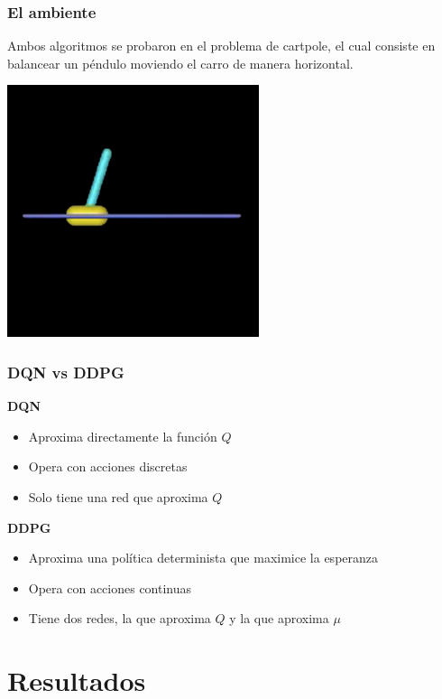 \documentclass[
    11pt,
    aspectratio=169,
]{beamer}
\begin{document}
\begin{frame}
\frametitle{El ambiente}
Ambos algoritmos se probaron en el problema de cartpole, el cual consiste en balancear un péndulo moviendo el carro de manera horizontal.

\begin{center}
\includegraphics[scale=0.4]{Images/cartpole}
\end{center}

\end{frame}

\begin{frame}
\frametitle{DQN vs DDPG}

\textbf{DQN}
\begin{itemize}
\item Aproxima directamente la función $Q$
\item Opera con acciones discretas
\item Solo tiene una red que aproxima $Q$
\end{itemize}

\textbf{DDPG}
\begin{itemize}
\item Aproxima una política determinista que maximice la esperanza
\item Opera con acciones continuas
\item Tiene dos redes, la que aproxima $Q$ y la que aproxima $\mu$
\end{itemize}

\end{frame}

\section{Resultados}
\end{document}
